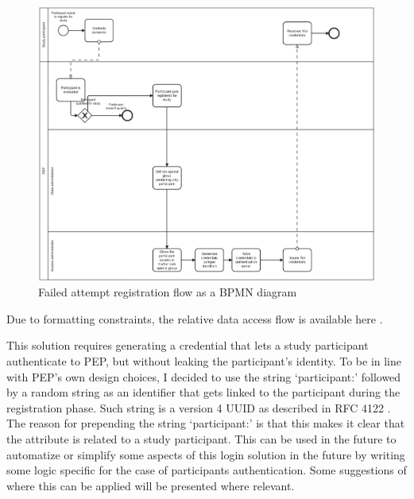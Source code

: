 \documentclass{report}
\begin{document}
\begin{figure}[H]
	\includegraphics[scale=0.1]{registration_flow.png}
	\caption{Failed attempt registration flow as a BPMN diagram}
	\label{bpmn-registration-flow}
\end{figure}

Due to formatting constraints, the relative data access flow is available here \cite{data-access-failed-attempt-bpmn-diagram}.

This solution requires generating a credential that lets a study participant authenticate to PEP, but without leaking the participant's identity. To be in line with PEP's own
design choices, I decided to use the string \enquote*{participant:} followed by a random string as an identifier that gets linked to the participant during the registration phase. Such string is 
a version 4 UUID as described in RFC 4122 \cite{uuid_rfc}. The reason for prepending the string \enquote*{participant:} is that this makes it clear that the attribute is related to
a study participant. This can be used in the future to automatize or simplify some aspects of this login solution in the future by writing some logic specific for the case of
participants authentication. Some suggestions of where this can be applied will be presented where relevant.
\end{document}

